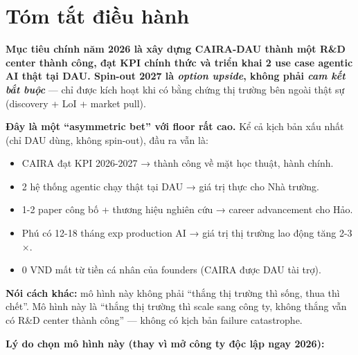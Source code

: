 \documentclass[11pt,a4paper]{article}
\begin{document}
\tableofcontents
\clearpage

\section*{Tóm tắt điều hành}

\begin{keybox}[title=Tái định vị chiến lược trong 1 câu]
\textbf{Mục tiêu chính năm 2026 là xây dựng CAIRA-DAU thành một R\&D center
thành công, đạt KPI chính thức và triển khai 2 use case agentic AI thật tại
DAU. Spin-out 2027 là \textit{option upside}, không phải \textit{cam kết bắt
buộc}} --- chỉ được kích hoạt khi có bằng chứng thị trường bên ngoài thật sự
(discovery + LoI + market pull).
\end{keybox}

\textbf{Đây là một ``asymmetric bet'' với floor rất cao.} Kể cả kịch bản xấu
nhất (chỉ DAU dùng, không spin-out), đầu ra vẫn là:

\begin{itemize}
\item CAIRA đạt KPI 2026-2027 → thành công về mặt học thuật, hành chính.
\item 2 hệ thống agentic chạy thật tại DAU → giá trị thực cho Nhà trường.
\item 1-2 paper công bố + thương hiệu nghiên cứu → career advancement cho Hảo.
\item Phú có 12-18 tháng exp production AI → giá trị thị trường lao động tăng 2-3$\times$.
\item 0 VND mất từ tiền cá nhân của founders (CAIRA được DAU tài trợ).
\end{itemize}

\textbf{Nói cách khác:} mô hình này không phải ``thắng thị trường thì sống,
thua thì chết''. Mô hình này là ``thắng thị trường thì scale sang công ty,
không thắng vẫn có R\&D center thành công'' --- không có kịch bản failure
catastrophe.

\textbf{Lý do chọn mô hình này (thay vì mở công ty độc lập ngay 2026):}
\end{document}

